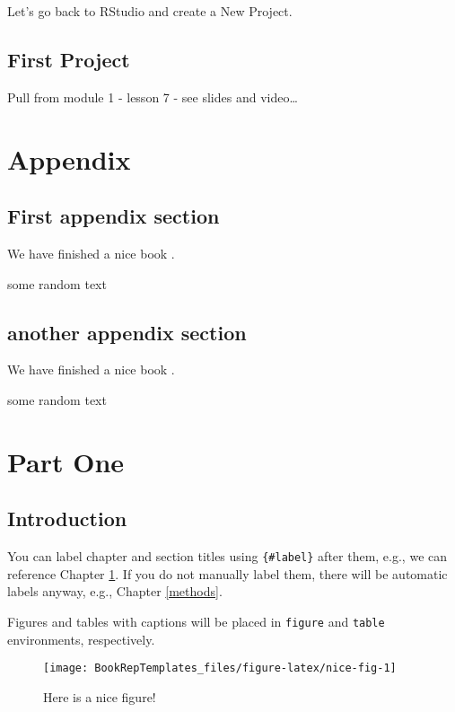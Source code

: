 \documentclass[]{book}
\theoremstyle{definition}
\theoremstyle{definition}
\theoremstyle{definition}
\theoremstyle{remark}
\begin{document}
Let's go back to RStudio and create a New Project.

\chapter{First Project}\label{firstproject}

Pull from module 1 - lesson 7 - see slides and video\ldots{}

\part{Appendix}\label{part-appendix}

\appendix


\chapter{First appendix section}\label{first-appendix-section}

We have finished a nice book .

some random  text

\chapter{another appendix section}\label{another-appendix-section}

We have finished a nice book .

some random  text

\part{Part One}\label{part-part-one-1}

\chapter{Introduction}\label{intro}

You can label chapter and section titles using \texttt{\{\#label\}}
after them, e.g., we can reference Chapter \ref{intro}. If you do not
manually label them, there will be automatic labels anyway, e.g.,
Chapter \ref{methods}.

Figures and tables with captions will be placed in \texttt{figure} and
\texttt{table} environments, respectively.

\begin{figure}

{\centering \texttt{[image: BookRepTemplates\_files/figure-latex/nice-fig-1]} 

}

\caption{Here is a nice figure!}\label{fig:nice-fig}
\end{figure}
\end{document}
